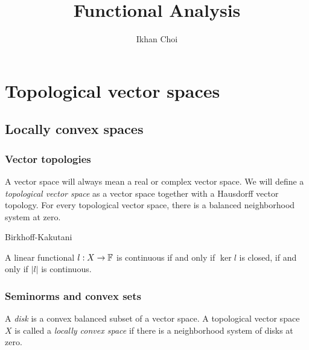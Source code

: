 \documentclass{../../large}
\begin{document}
\title{Functional Analysis}
\author{Ikhan Choi}
\maketitle
\tableofcontents

\part{Topological vector spaces}


\chapter{Locally convex spaces}
\section{Vector topologies}

\begin{prb}
A vector space will always mean a real or complex vector space.
We will define a \emph{topological vector space} as a vector space together with a Hausdorff vector topology.
For every topological vector space, there is a balanced neighborhood system at zero.
\end{prb}

\begin{prb}
\end{prb}

\begin{prb}
\end{prb}
\begin{prb}
Birkhoff-Kakutani
\end{prb}


\begin{prb}
A linear functional $l:X\to\mathbb{F}$ is continuous if and only if $\ker l$ is closed, if and only if $|l|$ is continuous.
\end{prb}



\section{Seminorms and convex sets}

\begin{prb}
A \emph{disk} is a convex balanced subset of a vector space.
A topological vector space $X$ is called a \emph{locally convex space} if there is a neighborhood system of disks at zero.

\end{prb}
\end{document}
